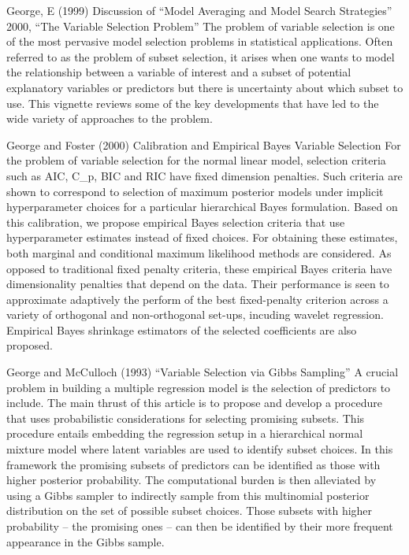 \documentclass{amsart}[12pt]
\begin{document}
George, E (1999) Discussion of ``Model Averaging and Model Search Strategies''
2000, ``The Variable Selection Problem''
The problem of variable selection is one of the most pervasive model selection problems in statistical
applications. Often referred to as the problem of subset selection, it arises when one wants to model the
relationship between a variable of interest and a subset of potential explanatory variables or predictors but
there is uncertainty about which subset to use. This vignette reviews some of the key developments that have led 
to the wide variety of approaches to the problem.

George and Foster (2000) Calibration and Empirical Bayes Variable Selection
For the problem of variable selection for the normal linear model, selection criteria such as AIC, C_p, BIC
and RIC have fixed dimension penalties. Such criteria are shown to correspond to selection of maximum
posterior models under implicit hyperparameter choices for a particular hierarchical Bayes formulation. Based
on this calibration, we propose empirical Bayes selection criteria that use hyperparameter estimates instead
of fixed choices. For obtaining these estimates, both marginal and conditional maximum likelihood methods are
considered. As opposed to traditional fixed penalty criteria, these empirical Bayes criteria have dimensionality
penalties that depend on the data. Their performance is seen to approximate adaptively the perform of the best
fixed-penalty criterion across a variety of orthogonal and non-orthogonal set-ups, incuding wavelet regression.
Empirical Bayes shrinkage estimators of the selected coefficients are also proposed.

George and McCulloch (1993) ``Variable Selection via Gibbs Sampling''
A crucial problem in building a multiple regression model is the selection of predictors to include. The main
thrust of this article is to propose and develop a procedure that uses probabilistic considerations for selecting
promising subsets. This procedure entails embedding the regression setup in a hierarchical normal mixture model 
where latent variables are used to identify subset choices. In this framework the promising subsets of predictors
can be identified as those with higher posterior probability. The computational burden is then alleviated by
using a Gibbs sampler to indirectly sample from this multinomial posterior distribution on the set of possible
subset choices. Those subsets with higher probability -- the promising ones -- can then be identified by their
more frequent appearance in the Gibbs sample.
\end{document}
